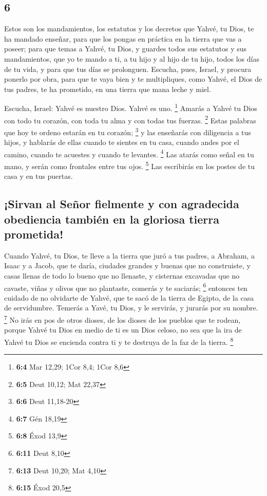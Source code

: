 \begin{paracol}{2}
\hypertarget{section-10}{%
\section{6}\label{section-10}}

 Estos son los mandamientos, los estatutos y los decretos
que Yahvé, tu Dios, te ha mandado enseñar, para que los pongas en
práctica en la tierra que vas a poseer;  para que temas a
Yahvé, tu Dios, y guardes todos sus estatutos y sus mandamientos, que yo
te mando a ti, a tu hijo y al hijo de tu hijo, todos los días de tu
vida, y para que tus días se prolonguen.  Escucha, pues,
Israel, y procura ponerlo por obra, para que te vaya bien y te
multipliques, como Yahvé, el Dios de tus padres, te ha prometido, en una
tierra que mana leche y miel.

 Escucha, Israel: Yahvé es nuestro Dios. Yahvé es uno.
\footnote{\textbf{6:4} Mar 12,29; 1Cor 8,4; 1Cor 8,6} 
Amarás a Yahvé tu Dios con todo tu corazón, con toda tu alma y con todas
tus fuerzas. \footnote{\textbf{6:5} Deut 10,12; Mat 22,37}
 Estas palabras que hoy te ordeno estarán en tu corazón;
\footnote{\textbf{6:6} Deut 11,18-20}  y las enseñarás con
diligencia a tus hijos, y hablarás de ellas cuando te sientes en tu
casa, cuando andes por el camino, cuando te acuestes y cuando te
levantes. \footnote{\textbf{6:7} Gén 18,19}  Las atarás
como señal en tu mano, y serán como frontales entre tus ojos.
\footnote{\textbf{6:8} Éxod 13,9}  Las escribirás en los
postes de tu casa y en tus puertas.

\hypertarget{sirvan-al-seuxf1or-fielmente-y-con-agradecida-obediencia-tambiuxe9n-en-la-gloriosa-tierra-prometida}{%
\subsection{¡Sirvan al Señor fielmente y con agradecida obediencia
también en la gloriosa tierra
prometida!}\label{sirvan-al-seuxf1or-fielmente-y-con-agradecida-obediencia-tambiuxe9n-en-la-gloriosa-tierra-prometida}}

 Cuando Yahvé, tu Dios, te lleve a la tierra que juró a
tus padres, a Abraham, a Isaac y a Jacob, que te daría, ciudades grandes
y buenas que no construiste,  y casas llenas de todo lo
bueno que no llenaste, y cisternas excavadas que no cavaste, viñas y
olivos que no plantaste, comerás y te saciarás; \footnote{\textbf{6:11}
  Deut 8,10}  entonces ten cuidado de no olvidarte de
Yahvé, que te sacó de la tierra de Egipto, de la casa de servidumbre.
 Temerás a Yavé, tu Dios, y le servirás, y jurarás por su
nombre. \footnote{\textbf{6:13} Deut 10,20; Mat 4,10}  No
irás en pos de otros dioses, de los dioses de los pueblos que te rodean,
 porque Yahvé tu Dios en medio de ti es un Dios celoso,
no sea que la ira de Yahvé tu Dios se encienda contra ti y te destruya
de la faz de la tierra. \footnote{\textbf{6:15} Éxod 20,5}


\end{paracol}
